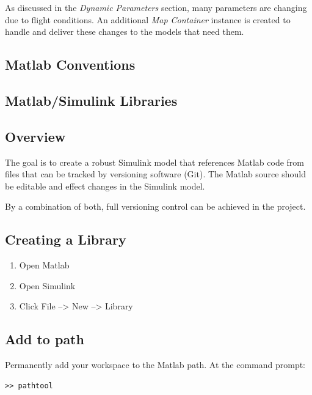 \documentclass[]{article}
\providecommand{\tightlist}{%
  \setlength{\itemsep}{0pt}\setlength{\parskip}{0pt}}
\begin{document}
As discussed in the \emph{Dynamic Parameters} section, many parameters
are changing due to flight conditions. An additional \emph{Map
Container} instance is created to handle and deliver these changes to
the models that need them.

\subsection{Matlab Conventions}\label{matlab-conventions}

\subsection{Matlab/Simulink Libraries}\label{matlabsimulink-libraries}

\subsection{Overview}\label{overview-3}

The goal is to create a robust Simulink model that references Matlab
code from files that can be tracked by versioning software (Git). The
Matlab source should be editable and effect changes in the Simulink
model.

By a combination of both, full versioning control can be achieved in the
project.

\subsection{Creating a Library}\label{creating-a-library}

\begin{enumerate}
\def\labelenumi{\arabic{enumi}.}
\tightlist
\item
  Open Matlab
\item
  Open Simulink
\item
  Click File --\textgreater{} New --\textgreater{} Library
\end{enumerate}

\subsection{Add to path}\label{add-to-path}

Permanently add your workspace to the Matlab path. At the command
prompt:

\begin{verbatim}
>> pathtool
\end{verbatim}
\end{document}
